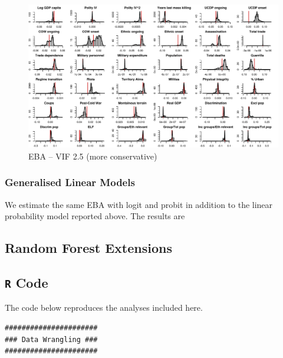 \clearpage
\begin{figure}
    \centering
    \includegraphics[width=\textwidth]{images/mk-high-vif.pdf}
    \caption{EBA -- VIF 2.5 (more conservative)}
    \label{fig:hist-mk-high-vif}
\end{figure}
\clearpage






















\newpage

\subsubsection{Generalised Linear Models}

We estimate the same EBA with logit and probit in addition to the linear probability model reported above. The results are 

\subsection{Random Forest Extensions}
\label{sec:mk-rfe}


\subsection{\texttt{R} Code}
\label{sec:mk-code}

The code below reproduces the analyses included here.

\singlespacing
\small
\begin{verbatim}
######################
### Data Wrangling ###
######################

\end{verbatim}


\doublespacing
\normalsize